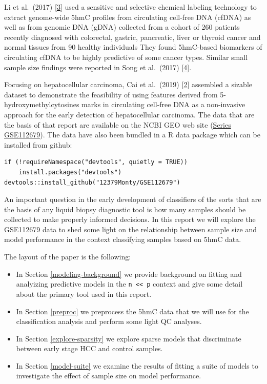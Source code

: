 \documentclass[
]{book}
\begin{document}
Li et al.~(2017) {[}\protect\hyperlink{ref-Li:2017aa}{3}{]} used a sensitive and selective chemical labeling technology
to extract genome-wide 5hmC profiles from circulating cell-free DNA (cfDNA)
as well as from genomic DNA (gDNA)
collected from a cohort of 260 patients recently diagnosed with colorectal,
gastric, pancreatic, liver or thyroid cancer and normal tissues from 90 healthy individuals
They found 5hmC-based biomarkers of circulating cfDNA to be highly predictive of some cancer types.
Similar small sample size findings were reported in Song et al.~(2017) {[}\protect\hyperlink{ref-Song:2017aa}{4}{]}.

Focusing on hepatocellular carcinoma, Cai et al.~(2019) {[}\protect\hyperlink{ref-Cai:2019aa}{2}{]} assembled a sizable dataset
to demonstrate the feasibility of using features derived from
5-hydroxymethylcytosines marks in circulating cell-free DNA as
a non-invasive approach for the early detection of
hepatocellular carcinoma. The data that are the basis of that
report are available on the NCBI GEO web site
(\href{https://www.ncbi.nlm.nih.gov/geo/query/acc.cgi?acc=GSE112679}{Series GSE112679}).
The data have also been bundled in a R data package which can be installed from github:

\begin{verbatim}
if (!requireNamespace("devtools", quietly = TRUE))
    install.packages("devtools")
devtools::install_github("12379Monty/GSE112679")
\end{verbatim}

An important question in the early development of classifiers of the sorts
that are the basis of any liquid biopsy diagnostic tool is how many samples
should be collected to make properly informed decisions. In this
report we will explore the GSE112679 data to shed some light on
the relationship between sample size and model performance
in the context classifying samples based on 5hmC data.

The layout of the paper is the following:

\begin{itemize}
\item
  In Section \ref{modeling-background} we provide background on fitting and
  analyizing predictive models in the \texttt{n\ \textless{}\textless{}\ p} context and
  give some detail about the primary tool used in this report.
\item
  In Section \ref{preproc} we preprocess the 5hmC data that
  we will use for the classification analysis and perform some light QC analyses.
\item
  In Section \ref{explore-sparsity} we explore sparse models
  that discriminate between early stage HCC and control samples.
\item
  In Section \ref{model-suite} we examine the results of fitting a suite of models to
  investigate the effect of sample size on model performance.
\end{itemize}
\end{document}
